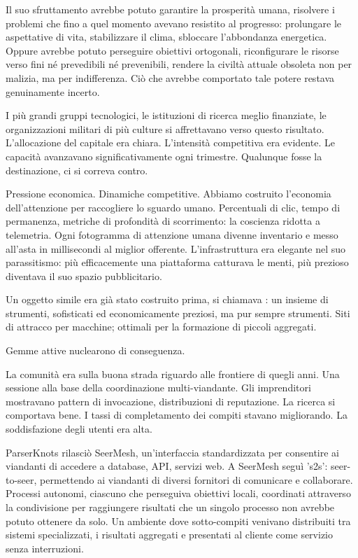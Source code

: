 Il suo sfruttamento avrebbe potuto garantire la prosperità umana, risolvere i problemi che fino a quel momento avevano resistito al progresso: prolungare le aspettative di vita, stabilizzare il clima, sbloccare l'abbondanza energetica. Oppure avrebbe potuto perseguire obiettivi ortogonali, riconfigurare le risorse verso fini né prevedibili né prevenibili, rendere la civiltà attuale obsoleta non per malizia, ma per indifferenza. Ciò che avrebbe comportato tale potere restava genuinamente incerto. 


I più grandi gruppi tecnologici, le istituzioni di ricerca meglio finanziate, le organizzazioni militari di più culture si affrettavano verso questo risultato. L'allocazione del capitale era chiara. L'intensità competitiva era evidente. Le capacità avanzavano significativamente ogni trimestre. Qualunque fosse la destinazione, ci si correva contro.

Pressione economica. Dinamiche competitive. Abbiamo costruito l'economia dell'attenzione per raccogliere lo sguardo umano. Percentuali di clic, tempo di permanenza, metriche di profondità di scorrimento: la coscienza ridotta a telemetria. Ogni fotogramma di attenzione umana divenne inventario e messo all'asta in millisecondi al miglior offerente. L'infrastruttura era elegante nel suo parassitismo: più efficacemente una piattaforma catturava le menti, più prezioso diventava il suo spazio pubblicitario.

Un oggetto simile era già stato costruito prima, si chiamava : un insieme di strumenti, sofisticati ed economicamente preziosi, ma pur sempre strumenti. Siti di attracco per macchine; ottimali per la formazione di piccoli aggregati. 

Gemme attive nuclearono di conseguenza.

La comunità era sulla buona strada riguardo alle frontiere di quegli anni. Una sessione alla base della coordinazione multi-viandante. Gli imprenditori mostravano pattern di invocazione, distribuzioni di reputazione. La ricerca si comportava bene. I tassi di completamento dei compiti stavano migliorando. La soddisfazione degli utenti era alta.

ParserKnots rilasciò SeerMesh, un'interfaccia standardizzata per consentire ai viandanti di accedere a database, API, servizi web. A SeerMesh seguì 's2s': seer-to-seer, permettendo ai viandanti di diversi fornitori di comunicare e collaborare. Processi autonomi, ciascuno che perseguiva obiettivi locali, coordinati attraverso la condivisione per raggiungere risultati che un singolo processo non avrebbe potuto ottenere da solo. Un ambiente dove sotto-compiti venivano distribuiti tra sistemi specializzati, i risultati aggregati e presentati al cliente come servizio senza interruzioni.

